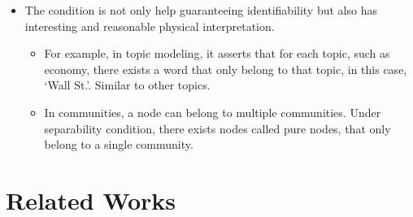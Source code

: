 \documentclass[10pt,xcolor={usenames,dvipsnames,table}]{beamer}
\begin{document}
\begin{frame}
{\begin{itemize}
        Consider a noiseless case, the sub-matrix $\bm{X}(:, \mathcal{K})$ that is constructed by stacking columns of $\bm{X}$ that has indices from $\mathcal{K}$.


    \item The condition is not only help guaranteeing identifiability but also has interesting and reasonable physical interpretation.
        \begin{itemize}
            \item For example, in topic modeling, it asserts that for each topic, such as economy, there exists a word that only belong to that topic, in this case, `Wall St.'. Similar to other topics.
            \item In communities, a node can belong to multiple communities. Under separability condition, there exists nodes called pure nodes, that only belong to a single community.
        \end{itemize}
\end{itemize}}
\end{frame}

\section{Related Works}%
\label{sec:what_have_people_done_}
\end{document}

